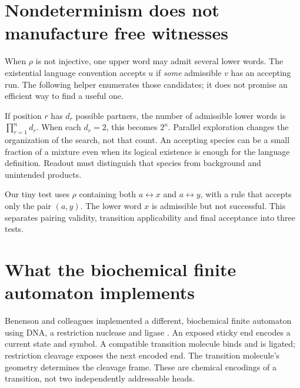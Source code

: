 \section{Nondeterminism does not manufacture free witnesses}
When $\rho$ is not injective, one upper word may admit several lower words.
The existential language convention accepts $u$ if \emph{some} admissible
$v$ has an accepting run. The following helper enumerates those candidates;
it does not promise an efficient way to find a useful one.


If position $r$ has $d_r$ possible partners, the number of admissible lower
words is $\prod_{r=1}^{n}d_r$. When each $d_r=2$, this becomes $2^n$.
Parallel exploration changes the organization of the search, not that count.
An accepting species can be a small fraction of a mixture even when its
logical existence is enough for the language definition. Readout must
distinguish that species from background and unintended products.

Our tiny test uses $\rho$ containing both $a\leftrightarrow x$ and
$a\leftrightarrow y$, with a rule that accepts only the pair $(a,y)$.
The lower word $x$ is admissible but not successful. This separates pairing
validity, transition applicability and final acceptance into three tests.

\section{What the biochemical finite automaton implements}
Benenson and colleagues implemented a different, biochemical finite automaton
using DNA, a restriction nuclease and ligase \cite{benenson}. An exposed sticky
end encodes a current state and symbol. A compatible transition molecule binds
and is ligated; restriction cleavage exposes the next encoded end. The
transition molecule's geometry determines the cleavage frame. These are
chemical encodings of a transition, not two independently addressable heads.


